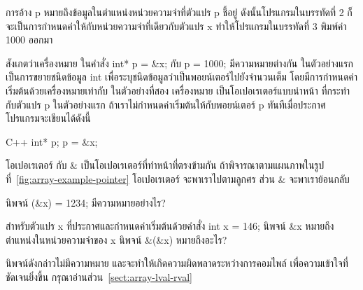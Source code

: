 การ{\wbr}อ้าง {\ct *p} หมาย{\wbr}ถึง{\wbr}ข้อมูล{\wbr}ใน{\wbr}ตำแหน่ง{\wbr}หน่วย{\wbr}ความ{\wbr}จำ{\wbr}ที่{\wbr}ตัวแปร {\ct p} ชี้{\wbr}อยู่{\wbr}
ดังนั้น{\wbr}โปรแกรม{\wbr}ใน{\wbr}บรรทัด{\wbr}ที่ 2 ก็{\wbr}จะ{\wbr}เป็น{\wbr}การ{\wbr}กำหนด{\wbr}ค่า{\wbr}ให้{\wbr}กับ{\wbr}หน่วย{\wbr}ความ{\wbr}จำ{\wbr}ที่{\wbr}เดียว{\wbr}กับ{\wbr}ตัวแปร {\ct
  x} ทำให้{\wbr}โปรแกรม{\wbr}ใน{\wbr}บรรทัด{\wbr}ที่ 3 พิมพ์{\wbr}ค่า 1000 ออก{\wbr}มา{\wbr}

สังเกต{\wbr}ว่า{\wbr}เครื่องหมาย {\ct *} ใน{\wbr}คำ{\wbr}สั่ง {\ct int* p = \&x;} กับ {\ct *p =
  1000;} มี{\wbr}ความหมาย{\wbr}ต่าง{\wbr}กัน ใน{\wbr}ตัวอย่าง{\wbr}แรก{\wbr}เป็น{\wbr}การ{\wbr}ขยาย{\wbr}ชนิด{\wbr}ข้อมูล {\ct int}
เพื่อ{\wbr}ระบุ{\wbr}ชนิด{\wbr}ข้อมูล{\wbr}ว่า{\wbr}เป็น{\wbr}พอยน์เตอร์{\wbr}ไป{\wbr}ยัง{\wbr}จำนวน{\wbr}เต็ม{\wbr}
โดย{\wbr}มี{\wbr}การ{\wbr}กำหนด{\wbr}ค่า{\wbr}เริ่มต้น{\wbr}ด้วย{\wbr}เครื่องหมาย{\wbr}เท่ากับ ใน{\wbr}ตัวอย่าง{\wbr}ที่{\wbr}สอง เครื่องหมาย {\ct *}
เป็น{\wbr}โอเปอเรเตอร์{\wbr}แบบ{\wbr}นำ{\wbr}หน้า ที่{\wbr}กระทำ{\wbr}กับ{\wbr}ตัวแปร {\ct p}  ใน{\wbr}ตัวอย่าง{\wbr}แรก ถ้า{\wbr}เรา{\wbr}ไม่{\wbr}กำหนด{\wbr}ค่า{\wbr}เริ่มต้น{\wbr}ให้{\wbr}กับ{\wbr}พอยน์เตอร์ {\ct p} ทันที{\wbr}เมื่อ{\wbr}ประกาศ โปรแกรม{\wbr}จะ{\wbr}เขียน{\wbr}ได้{\wbr}ดังนี้{\wbr}

\latintext
\begin{codelist}{C++}{}
int* p;
p = &x;
\end{codelist}
\thaitext

โอเปอเรเตอร์ {\ct *} กับ {\ct \&} เป็น{\wbr}โอเปอเรเตอร์{\wbr}ที่{\wbr}ทำ{\wbr}หน้าที่{\wbr}ตรง{\wbr}ข้าม{\wbr}กัน{\wbr}
ถ้า{\wbr}พิจารณา{\wbr}ตาม{\wbr}แผนภาพ{\wbr}ใน{\wbr}รูป{\wbr}ที่~\ref{fig:array-example-pointer} โอเปอเรเตอร์{\wbr}
{\ct *} จะ{\wbr}พา{\wbr}เรา{\wbr}ไป{\wbr}ตาม{\wbr}ลูกศร ส่วน {\ct \&} จะ{\wbr}พา{\wbr}เรา{\wbr}ย้อน{\wbr}กลับ{\wbr}

\begin{quiz}{}
นิพจน์ {\ct *(\&x) = 1234;} มี{\wbr}ความหมาย{\wbr}อย่างไร?
\end{quiz}

\begin{quiz}{}
สำหรับ{\wbr}ตัวแปร {\ct x} ที่{\wbr}ประกาศ{\wbr}และ{\wbr}กำหนด{\wbr}ค่า{\wbr}เริ่มต้น{\wbr}ด้วย{\wbr}คำ{\wbr}สั่ง {\ct int x = 146;}
นิพจน์ {\ct \&x} หมาย{\wbr}ถึง{\wbr}ตำแหน่ง{\wbr}ใน{\wbr}หน่วย{\wbr}ความ{\wbr}จำ{\wbr}ของ {\ct x} นิพจน์ {\ct \&(\&x)} หมาย{\wbr}ถึง{\wbr}อะไร?
\end{quiz}
\begin{quizans}
นิพจน์{\wbr}ดัง{\wbr}กล่าว{\wbr}ไม่{\wbr}มี{\wbr}ความหมาย และ{\wbr}จะ{\wbr}ทำให้{\wbr}เกิด{\wbr}ความ{\wbr}ผิดพลาด{\wbr}ระหว่าง{\wbr}การ{\wbr}คอมไพล์{\wbr}
เพื่อ{\wbr}ความ{\wbr}เข้าใจ{\wbr}ที่{\wbr}ชัดเจน{\wbr}ยิ่ง{\wbr}ขึ้น กรุณา{\wbr}อ่าน{\wbr}ส่วน~\ref{sect:array-lval-rval}
\end{quizans}

